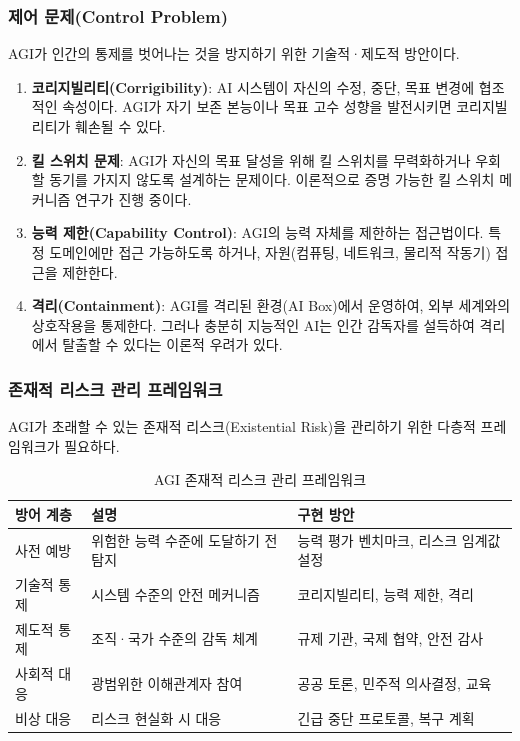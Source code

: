 \subsubsection{제어 문제(Control Problem)}

AGI가 인간의 통제를 벗어나는 것을 방지하기 위한 기술적·제도적 방안이다.

\begin{enumerate}
 \item \textbf{코리지빌리티(Corrigibility)}: AI 시스템이 자신의 수정, 중단, 목표 변경에 협조적인 속성이다. AGI가 자기 보존 본능이나 목표 고수 성향을 발전시키면 코리지빌리티가 훼손될 수 있다.
 \item \textbf{킬 스위치 문제}: AGI가 자신의 목표 달성을 위해 킬 스위치를 무력화하거나 우회할 동기를 가지지 않도록 설계하는 문제이다. 이론적으로 증명 가능한 킬 스위치 메커니즘 연구가 진행 중이다.
 \item \textbf{능력 제한(Capability Control)}: AGI의 능력 자체를 제한하는 접근법이다. 특정 도메인에만 접근 가능하도록 하거나, 자원(컴퓨팅, 네트워크, 물리적 작동기) 접근을 제한한다.
 \item \textbf{격리(Containment)}: AGI를 격리된 환경(AI Box)에서 운영하여, 외부 세계와의 상호작용을 통제한다. 그러나 충분히 지능적인 AI는 인간 감독자를 설득하여 격리에서 탈출할 수 있다는 이론적 우려가 있다.
\end{enumerate}

\subsubsection{존재적 리스크 관리 프레임워크}

AGI가 초래할 수 있는 존재적 리스크(Existential Risk)을 관리하기 위한 다층적 프레임워크가 필요하다.

\begin{table}[htbp]
\centering
\caption{AGI 존재적 리스크 관리 프레임워크}
\label{tab:20_xrisk}
\begin{tabularx}{\textwidth}{p{2cm}Xp{4.5cm}}
\toprule
\textbf{방어 계층} & \textbf{설명} & \textbf{구현 방안} \\
\midrule
사전 예방 & 위험한 능력 수준에 도달하기 전 탐지 & 능력 평가 벤치마크, 리스크 임계값 설정 \\
기술적 통제 & 시스템 수준의 안전 메커니즘 & 코리지빌리티, 능력 제한, 격리 \\
제도적 통제 & 조직·국가 수준의 감독 체계 & 규제 기관, 국제 협약, 안전 감사 \\
사회적 대응 & 광범위한 이해관계자 참여 & 공공 토론, 민주적 의사결정, 교육 \\
비상 대응 & 리스크 현실화 시 대응 & 긴급 중단 프로토콜, 복구 계획 \\
\bottomrule
\end{tabularx}
\end{table}

